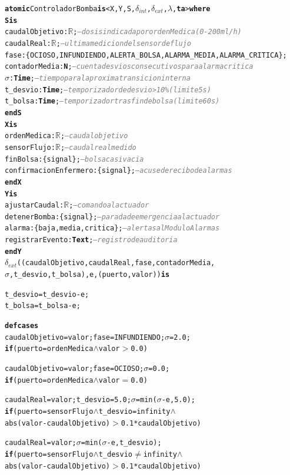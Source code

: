 \documentclass[12pt, a4paper]{article}
\newcommand{\cmlgt}{$>$}
\newcommand{\cmleq}{$=$}
\newcommand{\cmlwedge}{$\wedge$}
\newcommand{\cmlneq}{$\neq$}
\newcommand{\kw}[1]{\textbf{#1}}          %
\newcommand{\cmlR}{$\mathbb{R}$}
\newcommand{\cmlTime}{\textbf{Time}}
\newcommand{\cmlsigma}{$\sigma$}
\newcommand{\dint}{$\delta_{\mathit{int}}$}
\newcommand{\dext}{$\delta_{\mathit{ext}}$}
\newcommand{\clambda}{$\lambda$}
\newcommand{\cmlta}{\textbf{ta}}
\newcommand{\cmlcomment}[1]{\textit{\textcolor{gray}{#1}}}
\newenvironment{cmldevs}{%
  \begin{alltt}\small%
}{%
  \end{alltt}%
}
\begin{document}
\begin{center}
\begin{cmldevs}
\kw{atomic} ControladorBomba \kw{is} <X, Y, S, \dint{}, \dext{}, \clambda{}, \cmlta{}> \kw{where}
\kw{S is}
    caudalObjetivo : \cmlR{};  \cmlcomment{-- dosis indicada por ordenMedica (0-200 ml/h)}
    caudalReal     : \cmlR{};  \cmlcomment{-- ultima medicion del sensor de flujo}
    fase : \{OCIOSO, INFUNDIENDO, ALERTA\_BOLSA, ALARMA\_MEDIA, ALARMA\_CRITICA\};
    contadorMedia  : \kw{N};   \cmlcomment{-- cuenta desvios consecutivos para alarma critica}
    \cmlsigma{}    : \cmlTime{};  \cmlcomment{-- tiempo para la proxima transicion interna}
    t\_desvio      : \cmlTime{};  \cmlcomment{-- temporizador de desvio >10\% (limite 5s)}
    t\_bolsa       : \cmlTime{};  \cmlcomment{-- temporizador tras fin de bolsa (limite 60s)}
\kw{end S}
\kw{X is}
    ordenMedica           : \cmlR{};      \cmlcomment{-- caudal objetivo}
    sensorFlujo           : \cmlR{};      \cmlcomment{-- caudal real medido}
    finBolsa              : \{signal\};   \cmlcomment{-- bolsa casi vacia}
    confirmacionEnfermero : \{signal\};   \cmlcomment{-- acuse de recibo de alarmas}
\kw{end X}
\kw{Y is}
    ajustarCaudal   : \cmlR{};      \cmlcomment{-- comando al actuador}
    detenerBomba    : \{signal\};   \cmlcomment{-- parada de emergencia al actuador}
    alarma          : \{baja, media, critica\};  \cmlcomment{-- alertas al ModuloAlarmas}
    registrarEvento : \kw{Text};    \cmlcomment{-- registro de auditoria}
\kw{end Y}
\dext{}((caudalObjetivo, caudalReal, fase, contadorMedia,
         \cmlsigma{}, t\_desvio, t\_bolsa), e, (puerto, valor)) \kw{is}
    
    t\_desvio = t\_desvio - e; 
    t\_bolsa = t\_bolsa - e;

    \kw{defcases}
        caudalObjetivo = valor; fase = INFUNDIENDO; \cmlsigma{} = 2.0;
            \kw{if} (puerto = ordenMedica \cmlwedge{} valor \cmlgt{} 0.0)
            
        caudalObjetivo = valor; fase = OCIOSO; \cmlsigma{} = 0.0;
            \kw{if} (puerto = ordenMedica \cmlwedge{} valor \cmleq{} 0.0)
            
        caudalReal = valor; t\_desvio = 5.0; \cmlsigma{} = min(\cmlsigma{} - e, 5.0);
            \kw{if} (puerto = sensorFlujo \cmlwedge{} t\_desvio = infinity \cmlwedge{} 
                abs(valor - caudalObjetivo) \cmlgt{} 0.1 * caudalObjetivo)
            
        caudalReal = valor; \cmlsigma{} = min(\cmlsigma{} - e, t\_desvio);
            \kw{if} (puerto = sensorFlujo \cmlwedge{} t\_desvio \cmlneq{} infinity \cmlwedge{} 
                abs(valor - caudalObjetivo) \cmlgt{} 0.1 * caudalObjetivo)
            

\end{cmldevs}
\end{center}
\end{document}

